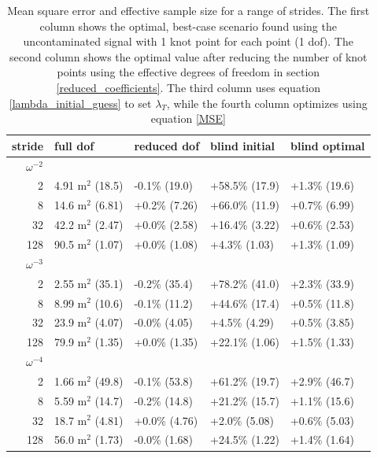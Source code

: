 \documentclass[10pt,journal]{IEEEtran}
\begin{document}
\begin{table}[ht]
\caption{Mean square error and effective sample size for a range of strides. The first column shows the optimal, best-case scenario found using the uncontaminated signal with 1 knot point for each point (1 dof). The second column shows the optimal value after reducing the number of knot points using the effective degrees of freedom in section \ref{reduced_coefficients}. The third column uses equation \ref{lambda_initial_guess} to set $\lambda_T$, while the fourth column optimizes using equation \ref{MSE} }
\label{fit_results_gaussian}
\centering
\begin{tabular}{r | llll} stride & full dof & reduced dof & blind initial & blind optimal \\ \hline \hline 
$\omega^{-2}$ &&&&  \\ \hline 
2 & 4.91 m$^2$ (18.5) &  -0.1\% (19.0) &  +58.5\% (17.9) &  +1.3\% (19.6) \\ 
8 & 14.6 m$^2$ (6.81) &  +0.2\% (7.26) &  +66.0\% (11.9) &  +0.7\% (6.99) \\ 
32 & 42.2 m$^2$ (2.47) &  +0.0\% (2.58) &  +16.4\% (3.22) &  +0.6\% (2.53) \\ 
128 & 90.5 m$^2$ (1.07) &  +0.0\% (1.08) &  +4.3\% (1.03) &  +1.3\% (1.09) \\ 
$\omega^{-3}$ &&&&  \\ \hline 
2 & 2.55 m$^2$ (35.1) &  -0.2\% (35.4) &  +78.2\% (41.0) &  +2.3\% (33.9) \\ 
8 & 8.99 m$^2$ (10.6) &  -0.1\% (11.2) &  +44.6\% (17.4) &  +0.5\% (11.8) \\ 
32 & 23.9 m$^2$ (4.07) &  -0.0\% (4.05) &  +4.5\% (4.29) &  +0.5\% (3.85) \\ 
128 & 79.9 m$^2$ (1.35) &  +0.0\% (1.35) &  +22.1\% (1.06) &  +1.5\% (1.33) \\ 
$\omega^{-4}$ &&&&  \\ \hline 
2 & 1.66 m$^2$ (49.8) &  -0.1\% (53.8) &  +61.2\% (19.7) &  +2.9\% (46.7) \\ 
8 & 5.59 m$^2$ (14.7) &  -0.2\% (14.8) &  +21.2\% (15.7) &  +1.1\% (15.6) \\ 
32 & 18.7 m$^2$ (4.81) &  +0.0\% (4.76) &  +2.0\% (5.08) &  +0.6\% (5.03) \\ 
128 & 56.0 m$^2$ (1.73) &  -0.0\% (1.68) &  +24.5\% (1.22) &  +1.4\% (1.64) \\ 
\end{tabular} 

\end{table}
\end{document}
